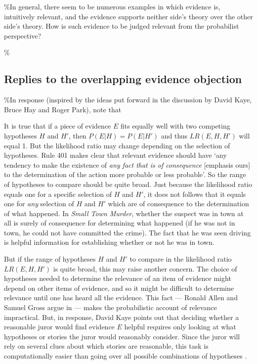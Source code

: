 \documentclass[10pt,dvipsnames,enabledeprecatedfontcommands]{scrartcl}
\begin{document}
\%In general, there seem to be numerous examples in which evidence is,
intuitively relevant, and the evidence supports neither side's theory
over the other side's theory. How is such evidence to be judged relevant
from the probabilist perspective?

\%\subsection{Replies to the overlapping evidence objection}

\%In response (inspired by the ideas put forward in the discussion by
David Kaye, Bruce Hay and Roger Park), note that

It is true that if a piece of evidence \(E\) fits equally well with two
competing hypotheses \(H\) and \(H'\), then \(P(E\vert H)=P(E\vert H')\)
and thus \(LR(E,H,H')\) will equal 1. But the likelihood ratio may
change depending on the selection of hypotheses. Rule 401 makes clear
that relevant evidence should have `any tendency to make the existence
of \emph{any fact that is of consequence} {[}emphasis ours{]} to the
determination of the action more probable or less probable'. So the
range of hypotheses to compare should be quite broad. Just because the
likelihood ratio equals one for a specific selection of \(H\) and
\(H'\), it does not follows that it equals one for \textit{any}
selection of \(H\) and \(H'\) which are of consequence to the
determination of what happened. In \textit{Small Town Murder}, whether
the suspect was in town at all is surely of consequence for determining
what happened (if he was not in town, he could not have committed the
crime). The fact that he was seen driving is helpful information for
establishing whether or not he was in town.

But if the range of hypotheses \(H\) and \(H'\) to compare in the
likelihood ratio \(LR(E, H, H')\) is quite broad, this may raise another
concern. The choice of hypotheses needed to determine the relevance of
an item of evidence might depend on other items of evidence, and so it
might be difficult to determine relevance until one has heard all the
evidence. This fact --- Ronald Allen and Samuel Gross argue in
\citep{park2010BayesWarsRedivivus} --- makes the probabilistic account
of relevance impractical. But, in response, David Kaye points out that
deciding whether a reasonable juror would find evidence \(E\) helpful
requires only looking at what hypotheses or stories the juror would
reasonably consider. Since the juror will rely on several clues about
which stories are reasonable, this task is computationally easier than
going over all possible combinations of hypotheses
\citep{park2010BayesWarsRedivivus}.
\end{document}

